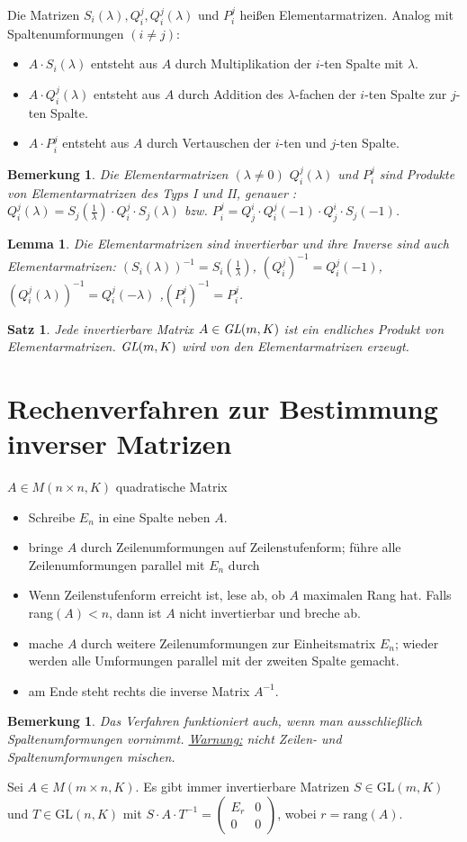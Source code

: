 \documentclass[12pt,a4paper]{article}
\theoremstyle{plain}
\newtheorem{Satz}[Theorem]{Satz}
\newtheorem{Lemma}[Theorem]{Lemma}
\newtheorem{Bemerkung}[Theorem]{Bemerkung}
\numberwithin{equation}{section}
\begin{document}
Die Matrizen $S_i(\lambda), Q^j_i, Q^j_i(\lambda)$ und $P^j_i$ heißen Elementarmatrizen. Analog mit Spaltenumformungen $(i\neq j)$: \begin{itemize}
\item $A\cdot S_i(\lambda)$ entsteht aus $A$ durch Multiplikation der $i$-ten Spalte mit $\lambda$.
\item $A\cdot Q^j_i(\lambda)$ entsteht aus $A$ durch Addition des $\lambda$-fachen der $i$-ten Spalte zur $j$-ten Spalte.
\item $A\cdot P^j_i$ entsteht aus $A$ durch Vertauschen der $i$-ten und $j$-ten Spalte.
\end{itemize}
\begin{Bemerkung}
Die Elementarmatrizen $(\lambda\neq 0)$ $Q^j_i(\lambda)$ und $P^j_i$ sind Produkte von Elementarmatrizen des Typs I und II, genauer : $Q^j_i(\lambda)=S_j(\frac{1}{\lambda})\cdot Q^j_i\cdot S_j(\lambda)$ bzw. $P^j_i=Q^i_j\cdot Q^j_i(-1)\cdot Q^i_j\cdot S_j(-1)$.
\end{Bemerkung}
\begin{Lemma}
Die Elementarmatrizen sind invertierbar und ihre Inverse sind auch Elementarmatrizen: $(S_i(\lambda))^{-1}=S_i(\frac{1}{\lambda})$, $(Q^j_i)^{-1}=Q^j_i(-1)$, $(Q_i^j(\lambda))^{-1}=Q^j_i(-\lambda)$ ,$(P^j_i)^{-1}=P^j_i$.
\end{Lemma}
\begin{Satz}
Jede invertierbare Matrix $A\in\emph{GL}(m,K)$ ist ein endliches Produkt von Elementarmatrizen. \glqq$\emph{GL}(m,K)$ wird von den Elementarmatrizen erzeugt.\grqq
\end{Satz}
\section{Rechenverfahren zur Bestimmung inverser Matrizen}
$A\in M(n\times n,K)$ quadratische Matrix
\begin{itemize}
\item Schreibe $E_n$ in eine Spalte neben $A$.
\item bringe $A$ durch Zeilenumformungen auf Zeilenstufenform; führe alle Zeilenumformungen parallel mit $E_n$ durch
\item Wenn Zeilenstufenform erreicht ist, lese ab, ob $A$ maximalen Rang hat. Falls rang$(A)<n$, dann ist $A$ nicht invertierbar und breche ab.
\item mache $A$ durch weitere Zeilenumformungen zur Einheitsmatrix $E_n$; wieder werden alle Umformungen parallel mit der zweiten Spalte gemacht.
\item am Ende steht rechts die inverse Matrix $A^{-1}$.
\end{itemize}
\begin{Bemerkung}
Das Verfahren funktioniert auch, wenn man ausschließlich Spaltenumformungen vornimmt. \underline{Warnung:} nicht Zeilen- und Spaltenumformungen mischen.
\end{Bemerkung}
Sei $A\in M(m\times n,K)$. Es gibt immer invertierbare Matrizen $S\in\text{GL}(m,K)$ und $T\in\text{GL}(n,K)$ mit $S\cdot A\cdot T^{-1}=\left(\begin{matrix} E_r & 0 \\ 0 & 0 \end{matrix}\right)$, wobei $r=\text{rang}(A)$.
\end{document}
